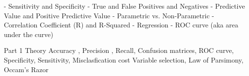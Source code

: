 - Sensitivity and Specificity
- True and False Positives and Negatives
- Predictive Value and Positive Predictive Value
- Parametric vs. Non-Parametric
- Correlation Coefficient (R) and R-Squared
- Regression
- ROC curve (aka area under the curve)

Part 1 Theory 
Accuracy , Precision , Recall, Confusion matrices, ROC curve, Specificity, Sensitivity, Misclasfication cost
Variable selection, Law of Parsimony, Occam's Razor































